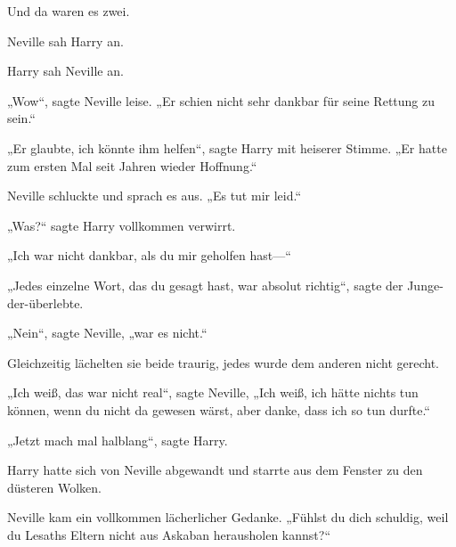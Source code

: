 Und da waren es zwei.

Neville sah Harry an.

Harry sah Neville an.

„Wow“, sagte Neville leise. „Er schien nicht sehr dankbar für seine Rettung zu sein.“

„Er glaubte, ich könnte ihm helfen“, sagte Harry mit heiserer Stimme. „Er hatte zum ersten Mal seit Jahren wieder Hoffnung.“

Neville schluckte und sprach es aus. „Es tut mir leid.“

„Was?“ sagte Harry vollkommen verwirrt.

„Ich war nicht dankbar, als du mir geholfen hast—“

„Jedes einzelne Wort, das du gesagt hast, war absolut richtig“, sagte der Junge-der-überlebte.

„Nein“, sagte Neville, „war es nicht.“

Gleichzeitig lächelten sie beide traurig, jedes wurde dem anderen nicht gerecht.

„Ich weiß, das war nicht real“, sagte Neville, „Ich weiß, ich hätte nichts tun können, wenn du nicht da gewesen wärst, aber danke, dass ich so tun durfte.“

„Jetzt mach mal halblang“, sagte Harry.

Harry hatte sich von Neville abgewandt und starrte aus dem Fenster zu den düsteren Wolken.

Neville kam ein vollkommen lächerlicher Gedanke. „Fühlst du dich schuldig, weil du Lesaths Eltern nicht aus Askaban herausholen kannst?“

